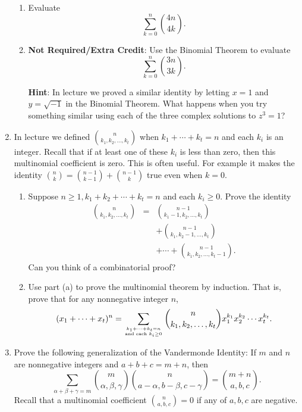 \documentclass[11pt]{article}
\begin{document}
\begin{enumerate}
\begin{enumerate}

\item Evaluate
\[ 
\sum_{k=0}^n \binom{4n}{4k}.
\]

\item {\bf Not Required/Extra Credit}: Use the Binomial Theorem to evaluate 
\[ 
\sum_{k=0}^n \binom{3n}{3k}.
\]

{\bf Hint}: In lecture we proved a similar identity by letting $x=1$ and $y= \sqrt{-1}$ in the Binomial Theorem.  What happens when you try something similar using each of the three complex solutions to $z^3 = 1$?

\end{enumerate}



\item In lecture we defined $\binom{n}{k_1,k_2, \ldots, k_t}$ when $k_1+\cdots + k_t = n$ and each $k_i$ is an integer.  Recall that if at least one of these $k_i$ is less than zero, then this multinomial coefficient is zero.  This is often useful.  For example it makes the identity $\binom{n}{k} = \binom{n-1}{k-1} + \binom{n-1}{k}$ true even when $k=0$.

\begin{enumerate}
\item Suppose $n \ge 1, k_1+k_2+\cdots +k_t = n$ and each $k_i \ge 0$.  Prove the identity
\begin{eqnarray*}
\binom{n}{k_1,k_2, \ldots, k_t}  & = & \binom{n-1}{k_1-1,k_2, \ldots, k_t} \\
&  & +  \binom{n-1}{k_1,k_2-1, \ldots, k_t} \\
&  & + \cdots +  \binom{n-1}{k_1,k_2, \ldots, k_t-1}.
\end{eqnarray*}
Can you think of a combinatorial proof?

\item Use part (a) to prove the multinomial theorem by induction.  That is, prove that for any nonnegative integer $n$,
\[
(x_1 + \cdots + x_t)^n = \sum_{k_1+\cdots + k_t = n \atop \text{and each } k_i \ge 0} \binom{n}{k_1,k_2, \ldots, k_t} x_1^{k_1} x_2^{k_2}\cdots x_t^{k_t}.
\]

\end{enumerate}

\item Prove the following generalization of the Vandermonde Identity: If $m$ and $n$ are nonnegative integers and $a+b+c = m+n$, then
\[
\sum_{\alpha+\beta+\gamma = m} \binom{m}{\alpha, \beta, \gamma} \binom{n}{a-\alpha, b - \beta, c- \gamma} = \binom{m+n}{a,b,c}.
\]
Recall that a multinomial coefficient $\binom{n}{a,b,c} = 0$ if any of $a,b,c$ are negative. 


\end{enumerate}
\end{document}
